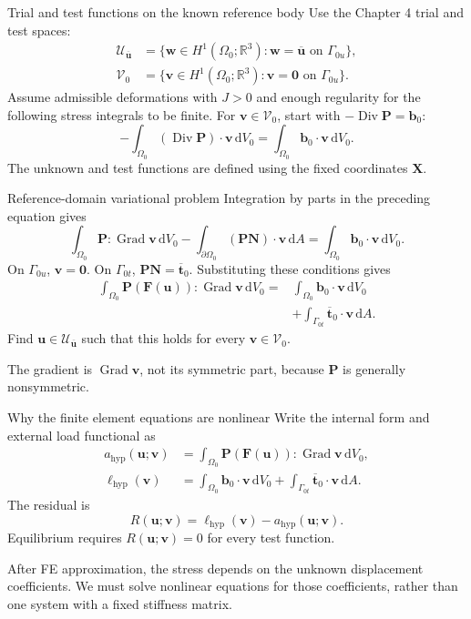 \documentclass[11pt,aspectratio=169]{beamer}
\newcommand{\bu}{\bm u}
\newcommand{\bv}{\bm v}
\newcommand{\bw}{\bm w}
\newcommand{\bX}{\bm X}
\newcommand{\bN}{\bm N}
\newcommand{\bb}{\bm b}
\newcommand{\bt}{\bm t}
\newcommand{\bF}{\bm F}
\newcommand{\bP}{\bm P}
\newcommand{\Grad}{\operatorname{Grad}}
\newcommand{\Div}{\operatorname{Div}}
\newcommand{\Vzero}{\mathcal V_0}
\begin{document}
\begin{frame}{Trial and test functions on the known reference body}
Use the Chapter 4 trial and test spaces:
\[
\begin{aligned}
\mathcal U_{\overline{\bu}}
&=\{\bw\in H^1(\Omega_0;\mathbb R^3):
\bw=\overline{\bu}\text{ on }\Gamma_{0u}\},\\
\Vzero
&=\{\bv\in H^1(\Omega_0;\mathbb R^3):
\bv=\bm0\text{ on }\Gamma_{0u}\}.
\end{aligned}
\]
Assume admissible deformations with $J>0$ and enough regularity for the
following stress integrals to be finite.
For $\bv\in\Vzero$, start with $-\Div\bP=\bb_0$:
\[
-\int_{\Omega_0}(\Div\bP)\cdot\bv\,\mathrm dV_0
=\int_{\Omega_0}\bb_0\cdot\bv\,\mathrm dV_0.
\]
The unknown and test functions are defined using the fixed coordinates $\bX$.
\end{frame}

\begin{frame}{Reference-domain variational problem}
Integration by parts in the preceding equation gives
\[
\int_{\Omega_0}\bP:\Grad\bv\,\mathrm dV_0
-\int_{\partial\Omega_0}(\bP\bN)\cdot\bv\,\mathrm dA
=\int_{\Omega_0}\bb_0\cdot\bv\,\mathrm dV_0.
\]
On $\Gamma_{0u}$, $\bv=\bm0$. On $\Gamma_{0t}$,
$\bP\bN=\overline{\bt}_0$. Substituting these conditions gives
\[
\begin{aligned}
\int_{\Omega_0}\bP(\bF(\bu)):\Grad\bv\,\mathrm dV_0
={}&\int_{\Omega_0}\bb_0\cdot\bv\,\mathrm dV_0\\
&+\int_{\Gamma_{0t}}\overline{\bt}_0\cdot\bv\,\mathrm dA.
\end{aligned}
\]
Find $\bu\in\mathcal U_{\overline{\bu}}$ such that this holds for every
$\bv\in\Vzero$.

The gradient is $\Grad\bv$, not its symmetric part, because $\bP$ is
generally nonsymmetric.
\end{frame}

\begin{frame}{Why the finite element equations are nonlinear}
Write the internal form and external load functional as
\[
\begin{aligned}
a_{\mathrm{hyp}}(\bu;\bv)
&=\int_{\Omega_0}\bP(\bF(\bu)):\Grad\bv\,\mathrm dV_0,\\
\ell_{\mathrm{hyp}}(\bv)
&=\int_{\Omega_0}\bb_0\cdot\bv\,\mathrm dV_0
+\int_{\Gamma_{0t}}\overline{\bt}_0\cdot\bv\,\mathrm dA.
\end{aligned}
\]
The residual is
\[
\boxed{R(\bu;\bv)=\ell_{\mathrm{hyp}}(\bv)-a_{\mathrm{hyp}}(\bu;\bv).}
\]
Equilibrium requires $R(\bu;\bv)=0$ for every test function.

After FE approximation, the stress depends on the unknown displacement
coefficients. We must solve nonlinear equations for those coefficients,
rather than one system with a fixed stiffness matrix.
\end{frame}
\end{document}
